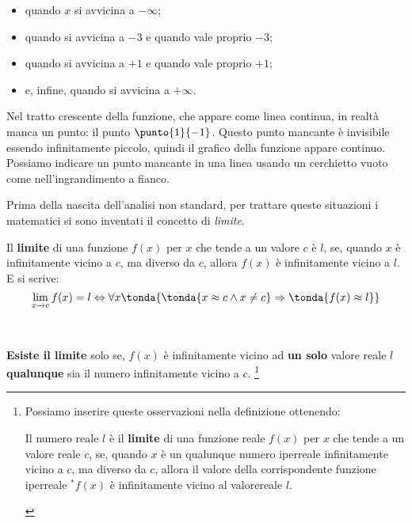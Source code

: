 \begin{minipage}{.64\textwidth}
\begin{itemize} [nosep]
 \item quando \(x\) si avvicina a \(-\infty\); 
 \item quando si avvicina a \(-3\) e quando vale proprio \(-3\);
 \item quando si avvicina a \(+1\) e quando vale proprio \(+1\); 
 \item e, infine, quando si avvicina a \(+\infty\).
\end{itemize}

\begin{osservazione}
Nel tratto crescente della funzione, che appare come linea continua, in 
realtà manca un punto: il punto \(\punto{1}{-1}\). 
Questo punto mancante è invisibile essendo infinitamente piccolo, quindi il 
grafico della funzione appare continuo. 
Possiamo indicare un punto mancante in una linea usando un cerchietto vuoto 
come nell'ingrandimento a fianco.
\end{osservazione}

\end{minipage}
\hfill
\begin{minipage}{.34\textwidth}
\begin{center}\scalebox{1.2}{\limitigraficob}\end{center}
\end{minipage}

\vspace{1em}
Prima della nascita dell'analisi non standard, per trattare queste 
situazioni i matematici si sono inventati il concetto di 
\emph{limite}.

\begin{definizione}
Il \textbf{limite} di una funzione \(f(x)\) per \(x\) 
che tende a un valore \(c\) è \(l\),
se, quando \(x\) è infinitamente vicino a \(c\), 
ma diverso da \(c\), 
allora \(f(x)\) è infinitamente vicino a \(l\). E si scrive:
\[\lim_{x \rightarrow c} f(x) = l \Leftrightarrow 
\forall x \tonda{\tonda{x \approx c \wedge x \neq c} \Rightarrow 
\tonda{f(x) \approx l}}\]
\end{definizione}
\begin{osservazione}
~

\textbf{Esiste il limite} solo se, \(f(x)\) è infinitamente vicino ad 
\textbf{un solo} valore reale \(l\) \textbf{qualunque} sia il numero 
infinitamente vicino a \(c\).
\footnote{Possiamo inserire queste osservazioni nella definizione ottenendo:
\begin{definizione}
Il numero reale \(l\) è il \textbf{limite} di una funzione reale \(f(x)\) 
per \(x\) che tende a un valore reale \(c\), se, 
quando \(x\) è un qualunque numero iperreale infinitamente vicino a \(c\), 
ma diverso da \(c\), 
allora il valore della corrispondente funzione iperreale \({}^*f(x)\) è 
infinitamente vicino al valorereale \(l\).
\end{definizione}}
\end{osservazione}

